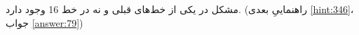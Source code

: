 \section{}
\paragraph{}\label{hint:40}
مشکل در یکی از خط‌های قبلی و نه در خط 16 وجود دارد. (راهنماییِ بعدی \ref{hint:346}، جواب \ref{answer:79})